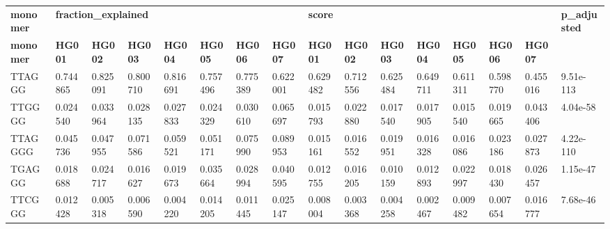 \begin{samepage} \begin{table}[h!] \small \begin{tabular}{llllllllllllllll}
\hline
\textbf{monomer}  &  \multicolumn{7}{l}{\textbf{fraction\_explained}}  &  \multicolumn{7}{l}{\textbf{score}}  &  \textbf{p\_adjusted} \\
\textbf{monomer}  &  \textbf{HG001}                                    &  \textbf{HG002}                      &  \textbf{HG003}           &  \textbf{HG004}  &  \textbf{HG005}  &  \textbf{HG006}  &  \textbf{HG007}  &  \textbf{HG001}  &  \textbf{HG002}  &  \textbf{HG003}  &  \textbf{HG004}  &  \textbf{HG005}  &  \textbf{HG006}  &  \textbf{HG007}  &  \textbf{} \\
\hline
TTAGGG            &  0.744865                                          &  0.825091                            &  0.800710                 &  0.816691        &  0.757496        &  0.775389        &  0.622001        &  0.629482        &  0.712556        &  0.625484        &  0.649711        &  0.611311        &  0.598770        &  0.455016        &  9.51e-113 \\
TTGGGG            &  0.024540                                          &  0.033964                            &  0.028135                 &  0.027833        &  0.024329        &  0.030610        &  0.065697        &  0.015793        &  0.022880        &  0.017540        &  0.017905        &  0.015540        &  0.019665        &  0.043406        &  4.04e-58 \\
TTAGGGG           &  0.045736                                          &  0.047955                            &  0.071586                 &  0.059521        &  0.051171        &  0.075990        &  0.089953        &  0.015161        &  0.016552        &  0.019951        &  0.016328        &  0.016086        &  0.023186        &  0.027873        &  4.22e-110 \\
TGAGGG            &  0.018688                                          &  0.024717                            &  0.016627                 &  0.019673        &  0.035664        &  0.028994        &  0.040595        &  0.012755        &  0.016205        &  0.010159        &  0.012893        &  0.022997        &  0.018430        &  0.026457        &  1.15e-47 \\
TTCGGG            &  0.012428                                          &  0.005318                            &  0.006590                 &  0.004220        &  0.014205        &  0.011445        &  0.025147        &  0.008004        &  0.003368        &  0.004258        &  0.002467        &  0.009482        &  0.007654        &  0.016777        &  7.68e-46 \\

\end{tabular}
\end{table}
\end{samepage}
